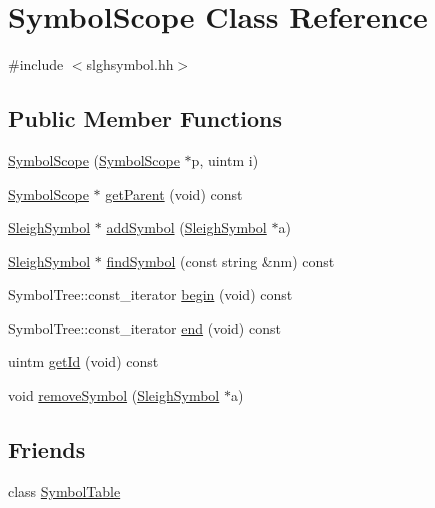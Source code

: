 \hypertarget{class_symbol_scope}{}\section{Symbol\+Scope Class Reference}
\label{class_symbol_scope}


{\ttfamily \#include $<$slghsymbol.\+hh$>$}

\subsection*{Public Member Functions}
\begin{DoxyCompactItemize}
\item 
\mbox{\hyperlink{class_symbol_scope_a0f2b600e40f7c3cce5b7461058332305}{Symbol\+Scope}} (\mbox{\hyperlink{class_symbol_scope}{Symbol\+Scope}} $\ast$p, uintm i)
\item 
\mbox{\hyperlink{class_symbol_scope}{Symbol\+Scope}} $\ast$ \mbox{\hyperlink{class_symbol_scope_aedff22c75734b479c4ce48cb87a2be23}{get\+Parent}} (void) const
\item 
\mbox{\hyperlink{class_sleigh_symbol}{Sleigh\+Symbol}} $\ast$ \mbox{\hyperlink{class_symbol_scope_a2cc1cecb62817eda6b3ef3000c4ade27}{add\+Symbol}} (\mbox{\hyperlink{class_sleigh_symbol}{Sleigh\+Symbol}} $\ast$a)
\item 
\mbox{\hyperlink{class_sleigh_symbol}{Sleigh\+Symbol}} $\ast$ \mbox{\hyperlink{class_symbol_scope_a454ef20ad6ce080c875a6342f4272c1b}{find\+Symbol}} (const string \&nm) const
\item 
Symbol\+Tree\+::const\+\_\+iterator \mbox{\hyperlink{class_symbol_scope_a3a89cb5a7be515b1ce623b91ed0935c8}{begin}} (void) const
\item 
Symbol\+Tree\+::const\+\_\+iterator \mbox{\hyperlink{class_symbol_scope_afb18a2563283ed5990eefca5fdaeae94}{end}} (void) const
\item 
uintm \mbox{\hyperlink{class_symbol_scope_ab78b27aa1cb0b43da992d9317db30b79}{get\+Id}} (void) const
\item 
void \mbox{\hyperlink{class_symbol_scope_a1b5507b8f6189308750c907f7e154a78}{remove\+Symbol}} (\mbox{\hyperlink{class_sleigh_symbol}{Sleigh\+Symbol}} $\ast$a)
\end{DoxyCompactItemize}
\subsection*{Friends}
\begin{DoxyCompactItemize}
\item 
class \mbox{\hyperlink{class_symbol_scope_ac1b80bc52166901e909169b2657de45f}{Symbol\+Table}}
\end{DoxyCompactItemize}


